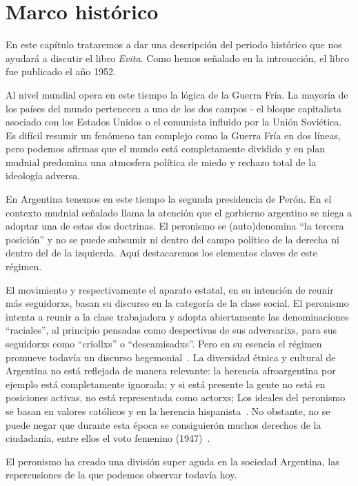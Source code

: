 \section{Marco histórico}

En este capítulo trataremos a dar una descripción del periodo histórico que nos ayudará a discutir el libro \textit{Evita}.
Como hemos señalado en la introucción, el libro fue publicado el año 1952.

Al nivel mundial opera en este tiempo la lógica de la Guerra Fría.
La mayoría de los países del mundo pertenecen a uno de los dos campos - el bloque capitalista asociado con los Estados Unidos o el comunista influido por la Unión Soviética.
Es difícil resumir un fenómeno tan complejo como la Guerra Fría en dos líneas, pero podemos afirmas que el mundo está completamente dividido y en plan mudnial predomina una atmosfera política de miedo y rechazo total de la ideología adversa.

En Argentina tenemos en este tiempo la segunda presidencia de Perón.
En el contexto mudnial señalado llama la atención que el gorbierno argentino se niega a adoptar una de estas dos doctrinas.
El peronismo se (auto)denomina ``la tercera posición'' y no se puede subsumir ni dentro del campo político de la derecha ni dentro del de la izquierda.
Aquí destacaremos los elementos claves de este régimen.

El movimiento y respectivamente el aparato estatal, en su intención de reunir más seguidorxs, basan su discurso en la categoría de la clase social.
El peronismo intenta a reunir a la clase trabajadora y adopta abiertamente las denominaciones ``raciales'', al principio pensadas como despectivas de sus adversarixs, para sus seguidorxs como ``criollxs'' o ``descamisadxs''.
Pero en su esencia el régimen promueve todavía un discurso hegemonial~\autocite{Chamosa2010}.
La diversidad étnica y cultural de Argentina no está reflejada de manera relevante:
la herencia afroargentina por ejemplo está completamente ignorada;
y si está presente la gente no está en posiciones activas, no está representada como actorxs;
Los ideales del peronismo se basan en valores católicos y en la herencia hispanista~\autocite[p.116]{Chamosa2010}.
No obstante, no se puede negar que durante esta época se consiguierón muchos derechos de la ciudadanía, entre ellos el voto femenino (1947)~\autocite[p.114]{Chamosa}.

El peronismo ha creado una división super aguda en la sociedad Argentina, las repercusiones de la que podemos observar todavía hoy.

